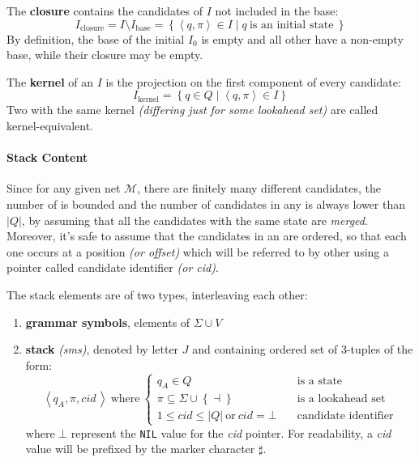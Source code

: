 \documentclass[english]{article}
\begin{document}
\begin{definition}
  The \textbf{closure} contains the candidates of \(I\) not included in the base:
  \[ I_{\text{closure}} = I \setminus I_{\text{base}} = \left\{ \left\langle q , \pi \right\rangle \in I \mid q \ \text{is an initial state} \ \right\} \]
  By definition, the base of the initial \mstate \(I_0\) is empty and all other \mstates have a non-empty base, while their closure may be empty.
\end{definition}

\begin{definition}
  The \textbf{kernel} of an \mstate \(I\) is the projection on the first component of every candidate:
  \[ I_{\text{kernel}} = \left\{ q \in Q \mid \left\langle q, \pi \right\rangle \in I \right\} \]
  Two \mstates with the same kernel \textit{(differing just for some lookahead set)} are called kernel-equivalent.
\end{definition}

\paragraph{Stack Content}
\label{par:stack-content}

Since for any given net \(\mathcal{M}\), there are finitely many different candidates, the number of \mstates is bounded and the number of candidates in any \mstate is always lower than \(| Q |\), by assuming that all the candidates with the same state are \textit{merged}.
Moreover, it's safe to assume that the candidates in an \mstate are ordered, so that each one occurs at a position \textit{(or offset)} which will be referred to by other \mstates using a pointer called candidate identifier \textit{(or cid)}.

The stack elements are of two types, interleaving each other:

\begin{enumerate}
  \item \textbf{grammar symbols}, elements of \(\Sigma \cup V\)
  \item \textbf{stack \mstates} \textit{(sms)}, denoted by letter \(J\) and containing ordered set of \(3\)-tuples of the form:
        \[ \left\langle q_A, \pi, \textit{cid} \, \right\rangle \ \text{where} \ \begin{cases}
            q_A \in Q \quad                                                        & \text{is a state}           \\
            \pi \subseteq \Sigma \cup \left\{ \dashv \right\} \quad                & \text{is a lookahead set}   \\
            1 \leq \textit{cid} \leq | Q | \ \text{or} \ \textit{cid} = \bot \quad & \text{candidate identifier}
          \end{cases} \]
        where \(\bot\) represent the \texttt{NIL} value for the \textit{cid} pointer.
        For readability, a \textit{cid} value will be prefixed by the marker character \(\sharp\).
\end{enumerate}
\end{document}
